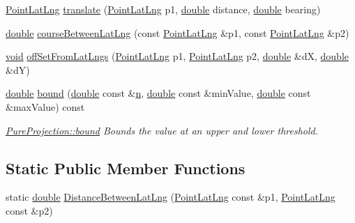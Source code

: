 \begin{DoxyCompactItemize}
\hyperlink{structinternals_1_1_point_lat_lng}{Point\-Lat\-Lng} \hyperlink{group___o_p_map_widget_gae41a7a74d45f66fa61c622f0838827ae}{translate} (\hyperlink{structinternals_1_1_point_lat_lng}{Point\-Lat\-Lng} p1, \hyperlink{_super_l_u_support_8h_a8956b2b9f49bf918deed98379d159ca7}{double} distance, \hyperlink{_super_l_u_support_8h_a8956b2b9f49bf918deed98379d159ca7}{double} bearing)
\item 
\hyperlink{_super_l_u_support_8h_a8956b2b9f49bf918deed98379d159ca7}{double} \hyperlink{group___o_p_map_widget_ga2b6a72edc701752748d62a513aea828b}{course\-Between\-Lat\-Lng} (const \hyperlink{structinternals_1_1_point_lat_lng}{Point\-Lat\-Lng} \&p1, const \hyperlink{structinternals_1_1_point_lat_lng}{Point\-Lat\-Lng} \&p2)
\item 
\hyperlink{group___u_a_v_objects_plugin_ga444cf2ff3f0ecbe028adce838d373f5c}{void} \hyperlink{group___o_p_map_widget_gaa4efe3b7598311215c44e7a0f47df531}{off\-Set\-From\-Lat\-Lngs} (\hyperlink{structinternals_1_1_point_lat_lng}{Point\-Lat\-Lng} p1, \hyperlink{structinternals_1_1_point_lat_lng}{Point\-Lat\-Lng} p2, \hyperlink{_super_l_u_support_8h_a8956b2b9f49bf918deed98379d159ca7}{double} \&d\-X, \hyperlink{_super_l_u_support_8h_a8956b2b9f49bf918deed98379d159ca7}{double} \&d\-Y)
\item 
\hyperlink{_super_l_u_support_8h_a8956b2b9f49bf918deed98379d159ca7}{double} \hyperlink{group___o_p_map_widget_ga0a978f088a3c28b59ce7bdf4ac3ab238}{bound} (\hyperlink{_super_l_u_support_8h_a8956b2b9f49bf918deed98379d159ca7}{double} const \&\hyperlink{glext_8h_a4eacae1d9e7c39f8236bb36d4ececa77}{n}, \hyperlink{_super_l_u_support_8h_a8956b2b9f49bf918deed98379d159ca7}{double} const \&min\-Value, \hyperlink{_super_l_u_support_8h_a8956b2b9f49bf918deed98379d159ca7}{double} const \&max\-Value) const 
\begin{DoxyCompactList}\small\item\em \hyperlink{group___o_p_map_widget_ga0a978f088a3c28b59ce7bdf4ac3ab238}{Pure\-Projection\-::bound} Bounds the value at an upper and lower threshold. \end{DoxyCompactList}\end{DoxyCompactItemize}
\subsection*{Static Public Member Functions}
\begin{DoxyCompactItemize}
\item 
static \hyperlink{_super_l_u_support_8h_a8956b2b9f49bf918deed98379d159ca7}{double} \hyperlink{group___o_p_map_widget_ga2dd7d98a1173081e9e81f2acb088f382}{Distance\-Between\-Lat\-Lng} (\hyperlink{structinternals_1_1_point_lat_lng}{Point\-Lat\-Lng} const \&p1, \hyperlink{structinternals_1_1_point_lat_lng}{Point\-Lat\-Lng} const \&p2)
\end{DoxyCompactItemize}
